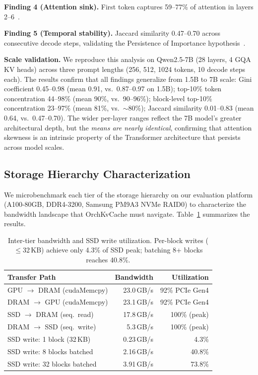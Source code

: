 \documentclass[conference]{IEEEtran}
\begin{document}
\textbf{Finding 4 (Attention sink).} First token captures 59--77\% of attention in layers 2--6~\cite{streamingllm}.

\textbf{Finding 5 (Temporal stability).} Jaccard similarity 0.47--0.70 across consecutive decode steps, validating the Persistence of Importance hypothesis~\cite{scissorhands}.

\textbf{Scale validation.} We reproduce this analysis on Qwen2.5-7B (28 layers, 4 GQA KV heads) across three prompt lengths (256, 512, 1024 tokens, 10 decode steps each). The results confirm that all findings generalize from 1.5B to 7B scale: Gini coefficient 0.45--0.98 (mean 0.91, vs.\ 0.87--0.97 on 1.5B); top-10\% token concentration 44--98\% (mean 90\%, vs.\ 90--96\%); block-level top-10\% concentration 23--97\% (mean 81\%, vs.\ ${\sim}$80\%); Jaccard similarity 0.01--0.83 (mean 0.64, vs.\ 0.47--0.70). The wider per-layer ranges reflect the 7B model's greater architectural depth, but the \emph{means are nearly identical}, confirming that attention skewness is an intrinsic property of the Transformer architecture that persists across model scales.

\subsection{Storage Hierarchy Characterization}
\label{sec:storage-char}

We microbenchmark each tier of the storage hierarchy on our evaluation platform (A100-80GB, DDR4-3200, Samsung PM9A3 NVMe RAID0) to characterize the bandwidth landscape that OrchKvCache must navigate. Table~\ref{tab:storage-char} summarizes the results.

\begin{table}[t]
\centering
\caption{Inter-tier bandwidth and SSD write utilization. Per-block writes ($\leq$32\,KB) achieve only 4.3\% of SSD peak; batching 8+ blocks reaches 40.8\%.}
\label{tab:storage-char}
\small
\begin{tabular}{@{}lrr@{}}
\toprule
Transfer Path & Bandwidth & Utilization \\
\midrule
GPU $\to$ DRAM (cudaMemcpy) & 23.0\,GB/s & 92\% PCIe Gen4 \\
DRAM $\to$ GPU (cudaMemcpy) & 23.1\,GB/s & 92\% PCIe Gen4 \\
SSD $\to$ DRAM (seq.\ read)  & 17.8\,GB/s & 100\% (peak) \\
DRAM $\to$ SSD (seq.\ write) & 5.3\,GB/s & 100\% (peak) \\
\midrule
SSD write: 1 block (32\,KB)  & 0.23\,GB/s & 4.3\% \\
SSD write: 8 blocks batched  & 2.16\,GB/s & 40.8\% \\
SSD write: 32 blocks batched & 3.91\,GB/s & 73.8\% \\
\bottomrule
\end{tabular}
\end{table}
\end{document}
